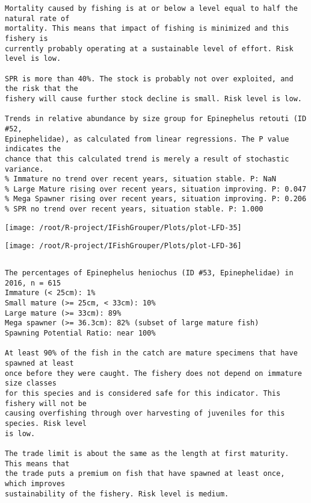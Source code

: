 \documentclass{report}\usepackage[]{graphicx}\usepackage[]{color}
\makeatletter
\def\maxwidth{ %
  \ifdim\Gin@nat@width>\linewidth
    \linewidth
  \else
    \Gin@nat@width
  \fi
}
\newenvironment{kframe}{%
 \def\at@end@of@kframe{}%
 \ifinner\ifhmode%
  \def\at@end@of@kframe{\end{minipage}}%
  \begin{minipage}{\columnwidth}%
 \fi\fi%
 \def\FrameCommand##1{\hskip\@totalleftmargin \hskip-\fboxsep
 \colorbox{shadecolor}{##1}\hskip-\fboxsep
     \hskip-\linewidth \hskip-\@totalleftmargin \hskip\columnwidth}%
 \MakeFramed {\advance\hsize-\width
   \@totalleftmargin\z@ \linewidth\hsize
   \@setminipage}}%
 {\par\unskip\endMakeFramed%
 \at@end@of@kframe}
\newenvironment{knitrout}{}{} %
\makeatother
\begin{document}
\begin{knitrout}
\begin{kframe}
\begin{verbatim}
Mortality caused by fishing is at or below a level equal to half the natural rate of
mortality. This means that impact of fishing is minimized and this fishery is
currently probably operating at a sustainable level of effort. Risk level is low.
 
SPR is more than 40%. The stock is probably not over exploited, and the risk that the
fishery will cause further stock decline is small. Risk level is low.
 
Trends in relative abundance by size group for Epinephelus retouti (ID #52,
Epinephelidae), as calculated from linear regressions. The P value indicates the
chance that this calculated trend is merely a result of stochastic variance.
% Immature no trend over recent years, situation stable. P: NaN
% Large Mature rising over recent years, situation improving. P: 0.047
% Mega Spawner rising over recent years, situation improving. P: 0.206
% SPR no trend over recent years, situation stable. P: 1.000
\end{verbatim}
\end{kframe}
\texttt{[image: /root/R-project/IFishGrouper/Plots/plot-LFD-35]} 

\texttt{[image: /root/R-project/IFishGrouper/Plots/plot-LFD-36]} 
\begin{kframe}\begin{verbatim}
\end{verbatim}
\end{kframe}
\clearpage
\newpage
\begin{kframe}\begin{verbatim}The percentages of Epinephelus heniochus (ID #53, Epinephelidae) in 2016, n = 615
Immature (< 25cm): 1%
Small mature (>= 25cm, < 33cm): 10%
Large mature (>= 33cm): 89%
Mega spawner (>= 36.3cm): 82% (subset of large mature fish)
Spawning Potential Ratio: near 100%
 
At least 90% of the fish in the catch are mature specimens that have spawned at least
once before they were caught. The fishery does not depend on immature size classes
for this species and is considered safe for this indicator. This fishery will not be
causing overfishing through over harvesting of juveniles for this species. Risk level
is low.

The trade limit is about the same as the length at first maturity.  This means that
the trade puts a premium on fish that have spawned at least once, which improves
sustainability of the fishery. Risk level is medium.


\end{verbatim}
\end{kframe}
\end{knitrout}
\end{document}
